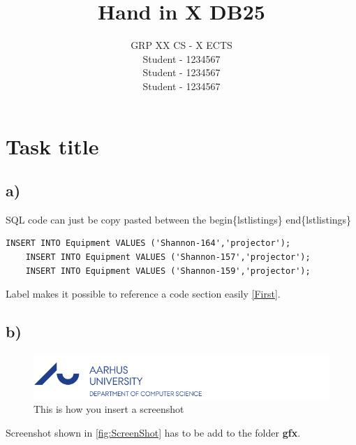\documentclass[twoside, a4paper, 11pt]{article}
\newcommand{\StudA}{\small Student - 1234567}
\newcommand{\StudB}{\small Student - 1234567}
\newcommand{\StudC}{\small Student - 1234567}
\newcommand{\GRP}{ GRP XX}
\newcommand{\study}{ CS - X ECTS}
\newcommand{\groupinfo}{\GRP \study \\ \StudA\\ \StudB\\ \StudC\\}
\begin{document}
	
	\title{Hand in X DB25} %
	\author{ \groupinfo}
	\date{}
	\maketitle
	\thispagestyle{empty}

\section{Task title}
\subsection*{a)}
SQL code can just be copy pasted between the begin\{lstlistings\} end\{lstlistings\}
\begin{lstlisting}[label=First, caption={SQL code}]
	INSERT INTO Equipment VALUES ('Shannon-164','projector');
	INSERT INTO Equipment VALUES ('Shannon-157','projector');
	INSERT INTO Equipment VALUES ('Shannon-159','projector');
\end{lstlisting}

\noindent
Label makes it possible to reference a code section easily \autoref{First}. 

\subsection*{b)}

\begin{figure}[h]
	\centering
	\includegraphics[width=1\linewidth]{gfx/logo}
	\caption{This is how you insert a screenshot} %
	\label{fig:ScreenShot}
\end{figure}

\noindent
Screenshot shown in \autoref{fig:ScreenShot} has to be add to the folder \textbf{gfx}.
\end{document}

